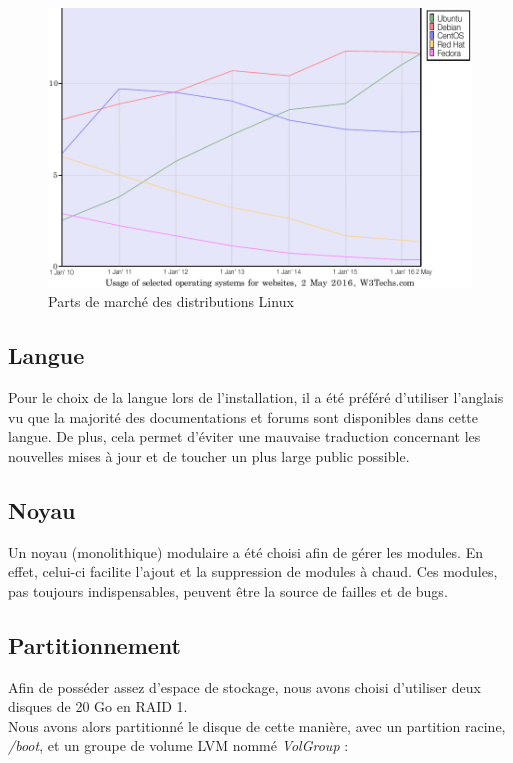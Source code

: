 \begin{figure}[h]
  \centering
  \includegraphics[scale=0.95]
  {textures/images/installation/distributions.pdf}
  \caption{Parts de marché des distributions Linux}
\end{figure}

\newpage

\subsection{Langue}
\label{subsec:langue}

Pour le choix de la langue lors de l'installation, il a été préféré d'utiliser
l'anglais vu que la majorité des documentations et forums sont disponibles dans
cette langue. De plus, cela permet d'éviter une mauvaise traduction concernant
les nouvelles mises à jour et de toucher un plus large public possible.

\subsection{Noyau}
\label{subsec:noyau}

Un noyau (monolithique) modulaire a été choisi afin de gérer les
modules. En effet, celui-ci facilite l'ajout et la suppression de modules à
chaud. Ces modules, pas toujours indispensables, peuvent être la source de
failles et de bugs.

\subsection{Partitionnement}
\label{subsec:partitionnement}

Afin de posséder assez d'espace de stockage, nous avons choisi d'utiliser deux
disques de 20 Go en RAID 1. \\
Nous avons alors partitionné le disque de cette manière, avec un partition racine,
\textit{/boot}, et un groupe de volume LVM nommé \textit{VolGroup} : \\

